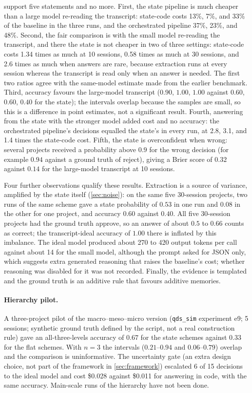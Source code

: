 \documentclass[11pt]{article}
\theoremstyle{definition}
\theoremstyle{remark}
\begin{document}
 support five statements and no more. First, the state pipeline is much cheaper than a large model re-reading the transcript: state-code costs 13\%, 7\%, and 33\% of the baseline in the three runs, and the orchestrated pipeline 37\%, 23\%, and 48\%. Second, the fair comparison is with the small model re-reading the transcript, and there the state is not cheaper in two of three settings: state-code costs 1.34 times as much at 10 sessions, 0.58 times as much at 30 sessions, and 2.6 times as much when answers are rare, because extraction runs at every session whereas the transcript is read only when an answer is needed. The first two ratios agree with the same-model estimate made from the earlier benchmark. Third, accuracy favours the large-model transcript ($0.90$, $1.00$, $1.00$ against $0.60$, $0.60$, $0.40$ for the state); the intervals overlap because the samples are small, so this is a difference in point estimates, not a significant result. Fourth, answering from the state with the stronger model added cost and no accuracy: the orchestrated pipeline's decisions equalled the state's in every run, at 2.8, 3.1, and 1.4 times the state-code cost. Fifth, the state is overconfident when wrong: several projects received a probability above $0.9$ for the wrong decision (for example $0.94$ against a ground truth of reject), giving a Brier score of $0.32$ against $0.14$ for the large-model transcript at 10 sessions.

Four further observations qualify these results. Extraction is a source of variance, amplified by the state itself (\cref{sec:noise}): on the same five 30-session projects, two runs of the same scheme gave a state probability of $0.53$ in one run and $0.08$ in the other for one project, and accuracy $0.60$ against $0.40$. All five 30-session projects had the ground truth approve, so an answer of about $0.5$ to $0.66$ counts as correct; the transcript-ideal accuracy of $1.00$ there is inflated by this imbalance. The ideal model produced about 270 to 420 output tokens per call against about 14 for the small model, although the prompt asked for JSON only, which suggests extra generated reasoning that raises the baseline's cost; whether reasoning was disabled for it was not recorded. Finally, the evidence is templated and the ground truth is an additive rule that favours additive memories.

\paragraph{Hierarchy pilot.} A three-project pilot of the macro--meso--micro version (\texttt{qds\_sim} experiment e9; 5 sessions; synthetic ground truth defined by the script, not a real construction rule) gave an all-three-levels accuracy of $0.67$ for the state schemes against $0.33$ for the flat schemes. With $n=3$ the intervals ($0.21$--$0.94$ and $0.06$--$0.79$) overlap and the comparison is uninformative. The uncertainty gate (an extra design choice, not part of the framework in \cref{sec:framework}) escalated 6 of 15 decisions to the ideal model and cost \$0.028 against \$0.011 for answering in code, with the same accuracy. Main-scale runs of the hierarchy have not been done.
\end{document}
